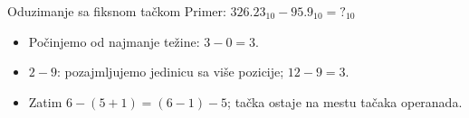 \begin{frame}[label=05-s018]{Oduzimanje sa fiksnom tačkom}
Primer: $326.23_{10}-95.9_{10}={?}_{10}$
\begin{center}\def\DEoper{-}\def\DErezultat{2,3,0,.,3,3}\end{center}
\fontsize{10}{12}\selectfont
\begin{itemize}
\item Počinjemo od najmanje težine: $3-0=3$.
\item $2-9$: pozajmljujemo jedinicu sa više pozicije; $12-9=3$.
\item Zatim $6-(5+1)=(6-1)-5$; tačka ostaje na mestu tačaka operanada.
\end{itemize}
\end{frame}
